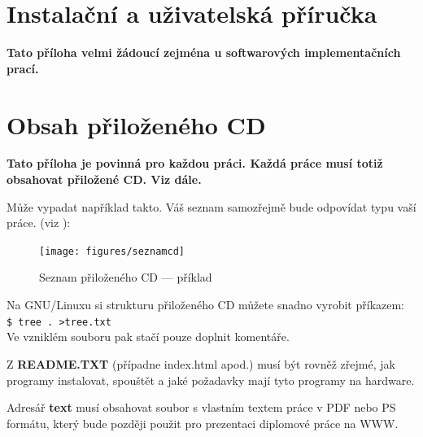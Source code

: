 \documentclass[11pt,twoside,a4paper]{book}
\begin{document}
\chapter{Instalační a uživatelská příručka}
\textbf{\large Tato příloha velmi žádoucí zejména u softwarových implementačních prací.}

\chapter{Obsah přiloženého CD}
\textbf{\large Tato příloha je povinná pro každou práci. Každá práce musí totiž obsahovat přiložené CD. Viz dále.}

Může vypadat například takto. Váš seznam samozřejmě bude odpovídat typu vaší práce. (viz \cite{infodp}):

\begin{figure}[h]
\begin{center}
\texttt{[image: figures/seznamcd]}
\caption{Seznam přiloženého CD --- příklad}
\label{fig:seznamcd}
\end{center}
\end{figure}

Na GNU/Linuxu si strukturu přiloženého CD můžete snadno vyrobit příkazem:\\ 
\verb|$ tree . >tree.txt|\\
Ve vzniklém souboru pak stačí pouze doplnit komentáře.

Z \textbf{README.TXT} (případne index.html apod.)  musí být rovněž zřejmé, jak programy instalovat, spouštět a jaké požadavky mají tyto programy na hardware.

Adresář \textbf{text}  musí obsahovat soubor s vlastním textem práce v PDF nebo PS formátu, který bude později použit pro prezentaci diplomové práce na WWW.
\end{document}
